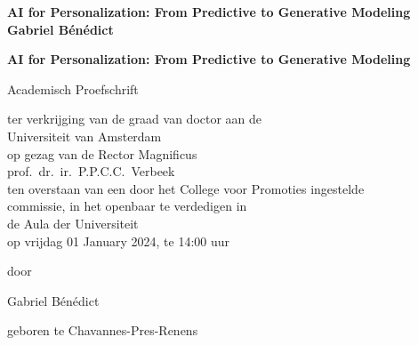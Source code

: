 
{\pagestyle{empty}
\newcommand{\printtitle}{%
{
\Huge\bf AI for Personalization: From Predictive to Generative Modeling\\[0.8cm]
}}

\begin{titlepage}
\par\vskip 2cm
\begin{center}
\printtitle
\vfill
{\LARGE\bf Gabriel Bénédict}		%
\vskip 2cm
\end{center}
\end{titlepage}


\mbox{}\newpage
\setcounter{page}{1}


\clearpage
\par\vskip 2cm
\begin{center}
\printtitle
\par\vspace {4cm}
{\large \sc Academisch Proefschrift}
\par\vspace {1cm}
{\large ter verkrijging van de graad van doctor aan de \\
Universiteit van Amsterdam\\
op gezag van de Rector Magnificus\\
prof.\ dr.\ ir.\ P.P.C.C.\ Verbeek\\
ten overstaan van een door het College voor Promoties ingestelde \\
commissie, in het openbaar te verdedigen in \\
de Aula der Universiteit\\
op vrijdag 01 January 2024, te 14:00 uur \\ } %
\par\vspace {1cm} {\large door}
\par \vspace {1cm}
{\Large Gabriel Bénédict}		%
\par\vspace {1cm}
{\large geboren te Chavannes-Pres-Renens} 	%
\end{center}


}
